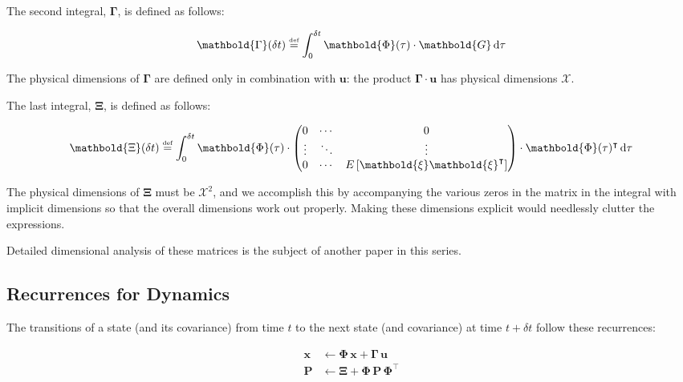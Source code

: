 \documentclass[10pt,oneside,x11names]{article}
\begin{document}
The second integral, \(\mathbold{\Gamma}\), is defined as follows:

\begin{equation}
\label{eqn:definition-of-Gamma}
\mathbold{\Gamma}(\delta t)\stackrel{\text{\tiny def}}{=}
\int_{0}^{\delta t}{\mathbold{\Phi}(\tau) \cdot \mathbold{G}\,\textrm{d}\tau } 
\end{equation}

\noindent The physical dimensions of \(\mathbold{\Gamma}\) are defined only in
combination with \(\mathbold{u}\): the product \(\mathbold{\Gamma}\cdot\mathbold{u}\)
has physical dimensions \(\mathcal{X}\). 

The last integral, \(\mathbold{\Xi}\), is defined as follows:

\begin{equation}
\label{eqn:definition-of-Xi}
\mathbold{\Xi}(\delta t)\stackrel{\text{\tiny def}}{=}
\int_{0}^{\delta t}\mathbold{\Phi}(\tau)\cdot{
\begin{pmatrix}
      0 & \cdots  &       0 \\
\vdots  & \ddots  & \vdots  \\ 
      0 & \cdots  & E\left[\mathbold{ \xi  }\mathbold{ \xi  }^{ \intercal  }\right] 
\end{pmatrix}\cdot\mathbold{\Phi}(\tau)^\intercal\,\textrm{d}\tau}
\end{equation}

\noindent The physical dimensions of \(\mathbold{\Xi}\) must be \(\mathcal{X}^2\), and we
accomplish this by accompanying the various zeros in the matrix in the integral
with implicit dimensions so that the overall dimensions work out properly.
Making these dimensions explicit would needlessly clutter the expressions.

Detailed dimensional analysis of these matrices is the subject of another paper
in this series.

\subsection{Recurrences for Dynamics}
\label{sec:org9e00059}

The transitions of a state (and its covariance) from time \(t\) to the next state
(and covariance) at time
\(t+\delta t\) follow these recurrences:

\begin{align}
\label{eqn:transition-of-state}
\mathbold{x}
&\leftarrow
\mathbold{\Phi}\,
\mathbold{x}+
\mathbold{\Gamma}\,
\mathbold{u} \\
\mathbold{P}
&\leftarrow
\mathbold{\Xi}+
\mathbold{\Phi}\,
\mathbold{P}\,
\mathbold{\Phi}^\intercal
\end{align}
\end{document}
